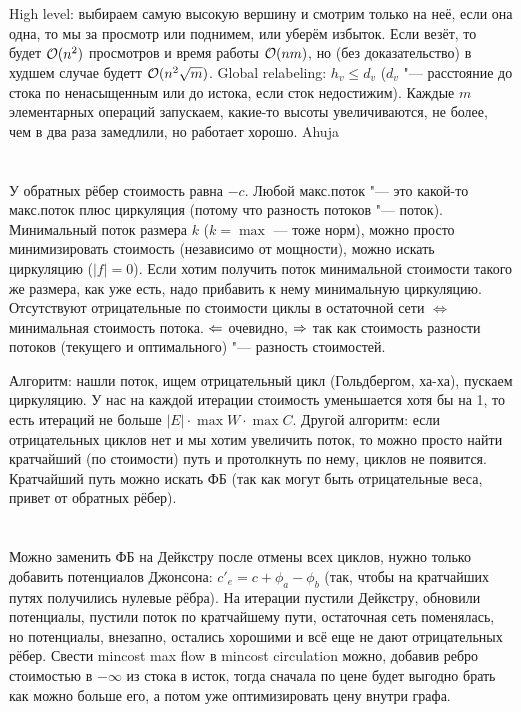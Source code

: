 \section{} %
High level: выбираем самую высокую вершину и смотрим только на неё, если она одна, то мы за просмотр или поднимем, или уберём избыток.
Если везёт, то будет $\mathcal{O}(n^2)$ просмотров и время работы $\mathcal{O}(nm)$, но (без доказательство) в худшем случае будетт $\mathcal{O}(n^2\sqrt m)$.
Global relabeling: $h_v \le d_v$ ($d_v$ "--- расстояние до стока по ненасыщенным или до истока, если сток недостижим).
Каждые $m$ элементарных операций запускаем, какие-то высоты увеличиваются, не более, чем в два раза замедлили, но работает хорошо.
\TODO Ahuja

\section{} %
\TODO

\section{} %
У обратных рёбер стоимость равна $-c$.
Любой макс.поток "--- это какой-то макс.поток плюс циркуляция (потому что разность потоков "--- поток).
Минимальный поток размера $k$ ($k=\max$ --- тоже норм), можно просто минимизировать стоимость (независимо от мощности), можно искать циркуляцию ($|f|=0$).
Если хотим получить поток минимальной стоимости такого же размера, как уже есть, надо прибавить к нему минимальную циркуляцию.
Отсутствуют отрицательные по стоимости циклы в остаточной сети $\iff$ минимальная стоимость потока.
$\Leftarrow$ очевидно, $\Rightarrow$ так как стоимость разности потоков (текущего и оптимального) "--- разность стоимостей.

Алгоритм: нашли поток, ищем отрицательный цикл (Гольдбергом, ха-ха), пускаем циркуляцию.
У нас на каждой итерации стоимость уменьшается хотя бы на 1, то есть итераций не больше $|E| \cdot \max W \cdot \max C$.
Другой алгоритм: если отрицательных циклов нет и мы хотим увеличить поток, то можно просто найти кратчайший (по стоимости) путь и протолкнуть по нему, циклов не появится.
Кратчайший путь можно искать ФБ (так как могут быть отрицательные веса, привет от обратных рёбер).

\section{} %
Можно заменить ФБ на Дейкстру после отмены всех циклов, нужно только добавить потенциалов Джонсона: $c'_e = c + \phi_a - \phi_b$
(так, чтобы на кратчайших путях получились нулевые рёбра).
На итерации пустили Дейкстру, обновили потенциалы, пустили поток по кратчайшему пути, остаточная сеть поменялась, но потенциалы, внезапно, остались хорошими и всё еще не дают отрицательных рёбер.
Свести mincost max flow в mincost circulation можно, добавив ребро стоимостью в $-\infty$ из стока в исток, тогда сначала по цене будет выгодно брать как можно больше его, а потом уже оптимизировать цену внутри графа.

